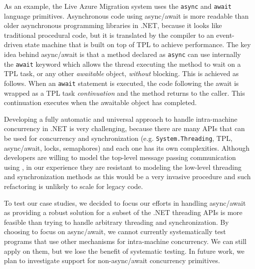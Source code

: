 As an example, the Live Azure Migration system uses the \texttt{async} and \texttt{await}  language primitives. Asynchronous code using async/await is more readable than older asynchronous programming libraries in .NET, because it looks like traditional procedural code, but it is translated by the compiler to an event-driven state machine that is built on top of TPL to achieve performance. The key idea behind async/await is that a method declared as \texttt{async} can use internally the \texttt{await} keyword which allows the thread executing the method to wait on a TPL task, or any other \emph{awaitable} object, \emph{without} blocking. This is achieved as follows. When an \texttt{await} statement is executed, the code following the await is wrapped as a TPL task \emph{continuation} and the method returns to the caller. This continuation executes when the awaitable object has completed.

Developing a fully automatic and universal approach to handle intra-machine concurrency in .NET is very challenging, because there are many APIs that can be used for concurrency and synchronization (e.g. \texttt{System.Threading}, TPL, async/await, locks, semaphores) and each one has its own complexities. Although developers are willing to model the top-level message passing communication using \psharp, in our experience they are resistant to modeling the low-level threading and synchronization methods as this would be a very invasive procedure and such refactoring is unlikely to scale for legacy code.

To test our case studies, we decided to focus our efforts in handling async/await as providing a robust solution for a subset of the .NET threading APIs is more feasible than trying to handle arbitrary threading and synchronization. By choosing to focus on async/await, we cannot currently systematically test programs that use other mechanisms for intra-machine concurrency.  We can still apply \psharp on them, but we lose the benefit of systematic testing. In future work, we plan to investigate support for non-async/await concurrency primitives.

